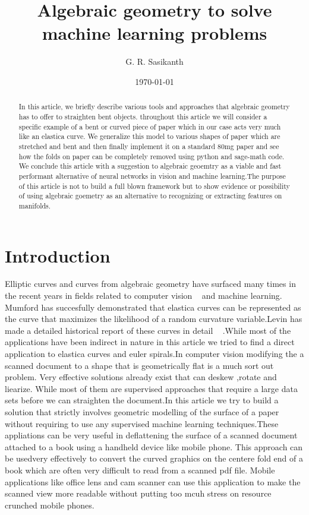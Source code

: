 \documentclass[twocolumn,longbibliography]{revtex4-1}
\begin{document}
\title{Algebraic geometry to solve machine learning problems}
\author{G. R. Sasikanth}
\date{\today}
\begin{abstract}
 In this article, we briefly describe various tools and approaches that algebraic geometry has to offer to straighten bent objects.
 throughout this article we will consider a specific example of a bent or curved piece of paper which in our case acts very much like an     
 elastica curve. We generalize this model to various shapes of paper which are stretched and bent and then finally implement it on 
 a standard 80mg paper and see how the folds on paper can be completely removed using python and sage-math code. We conclude this article
 with a suggestion to algebraic geoemtry as a viable and fast performant alternative of neural networks in vision and
 machine learning.The purpose of this article is not to build a full blown framework but to show evidence or possibility of using 
 algebraic goemetry as an alternative to recognizing or extracting features on manifolds.
\end{abstract}
\maketitle

\section{Introduction}
Elliptic curves and curves from algebraic geometry have surfaced many times in the recent years in fields related to computer vision ~\cite{Mumford} and machine learning. Mumford has succesfully demonstrated that elastica curves can be represented as the curve that maximizes the likelihood of a random curvature variable.Levin has made a detailed historical report of these curves in detail ~\cite{Levien} .While most of the applications have been indirect in nature in this article we tried to find a direct application to
elastica curves and euler spirals.In computer vision modifying the a scanned document to a shape that is geometrically flat is a much sort out problem. Very effective solutions already exist that can deskew ,rotate and liearize. While most of them are supervised approaches that require a large data sets before we can straighten the document.In this article we try to build a solution that strictly involves geometric modelling of the surface of a paper without requiring to use any supervised machine learning techniques.These appliations can be very useful in deflattening the surface of a scanned document attached to a book using a handheld device like mobile phone. This approach can be usedvery effectively to convert the curved graphics on the centere fold end of a book which are often very difficult to read from a scanned pdf file. Mobile applications like office lens and cam scanner can use this application to make the scanned view more readable without putting too mcuh stress on resource crunched mobile phones.
\end{document}
